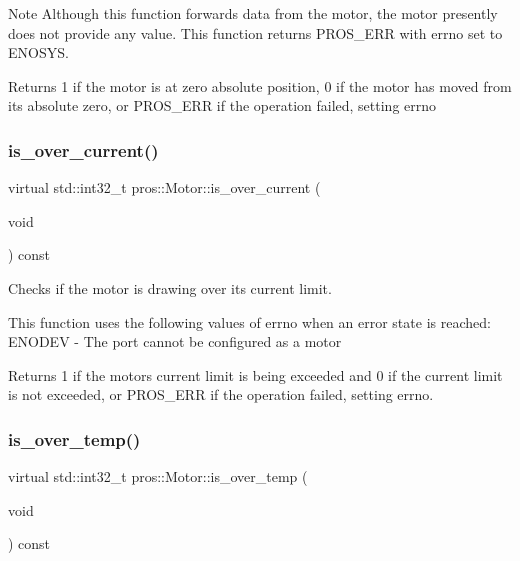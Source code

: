 \begin{DoxyNote}{Note}
Although this function forwards data from the motor, the motor presently does not provide any value. This function returns P\+R\+O\+S\+\_\+\+E\+RR with errno set to E\+N\+O\+S\+YS.
\end{DoxyNote}
\begin{DoxyReturn}{Returns}
1 if the motor is at zero absolute position, 0 if the motor has moved from its absolute zero, or P\+R\+O\+S\+\_\+\+E\+RR if the operation failed, setting errno 
\end{DoxyReturn}
\mbox{\label{classpros_1_1Motor_a2d34c92effccfbb4d2f45319bf4bd272}} 
\subsubsection{\texorpdfstring{is\+\_\+over\+\_\+current()}{is\_over\_current()}}
{\footnotesize\ttfamily virtual std\+::int32\+\_\+t pros\+::\+Motor\+::is\+\_\+over\+\_\+current (\begin{DoxyParamCaption}\item[{void}]{ }\end{DoxyParamCaption}) const\hspace{0.3cm}{\ttfamily [virtual]}}

Checks if the motor is drawing over its current limit.

This function uses the following values of errno when an error state is reached\+: E\+N\+O\+D\+EV -\/ The port cannot be configured as a motor

\begin{DoxyReturn}{Returns}
1 if the motor\textquotesingle{}s current limit is being exceeded and 0 if the current limit is not exceeded, or P\+R\+O\+S\+\_\+\+E\+RR if the operation failed, setting errno. 
\end{DoxyReturn}
\mbox{\label{classpros_1_1Motor_a099d50ed35d73fa29a46b2beb151ce2b}} 
\subsubsection{\texorpdfstring{is\+\_\+over\+\_\+temp()}{is\_over\_temp()}}
{\footnotesize\ttfamily virtual std\+::int32\+\_\+t pros\+::\+Motor\+::is\+\_\+over\+\_\+temp (\begin{DoxyParamCaption}\item[{void}]{ }\end{DoxyParamCaption}) const\hspace{0.3cm}{\ttfamily [virtual]}}

